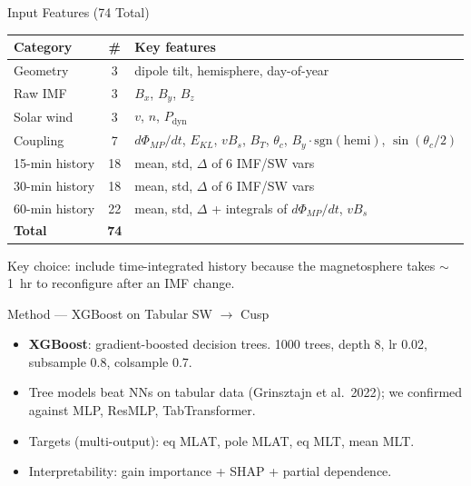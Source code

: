 \documentclass[aspectratio=169,11pt]{beamer}
\begin{document}
\begin{frame}{Input Features (74 Total)}
\centering
\footnotesize
\begin{tabular}{l c >{\raggedright\arraybackslash}p{8.0cm}}
\toprule
Category & \# & Key features \\
\midrule
Geometry        & 3  & dipole tilt, hemisphere, day-of-year \\
Raw IMF         & 3  & $B_x$, $B_y$, $B_z$ \\
Solar wind      & 3  & $v$, $n$, $P_\mathrm{dyn}$ \\
Coupling        & 7  & $d\Phi_{MP}/dt$, $E_{KL}$, $vB_s$, $B_T$, $\theta_c$, $B_y\cdot\mathrm{sgn}(\text{hemi})$, $\sin(\theta_c/2)$ \\
15-min history  & 18 & mean, std, $\Delta$ of 6 IMF/SW vars \\
30-min history  & 18 & mean, std, $\Delta$ of 6 IMF/SW vars \\
60-min history  & 22 & mean, std, $\Delta$ + integrals of $d\Phi_{MP}/dt$, $vB_s$ \\
\midrule
\textbf{Total}  & \textbf{74} & \\
\bottomrule
\end{tabular}
\vspace{0.3cm}

\normalsize Key choice: include time-integrated history because the magnetosphere takes $\sim$1~hr to reconfigure after an IMF change.
\end{frame}

\begin{frame}{Method --- XGBoost on Tabular SW $\to$ Cusp}
\begin{itemize}
\item \textbf{XGBoost}: gradient-boosted decision trees. 1000 trees, depth 8, lr 0.02, subsample 0.8, colsample 0.7.
\item Tree models beat NNs on tabular data (Grinsztajn et al.\ 2022); we confirmed against MLP, ResMLP, TabTransformer.
\item Targets (multi-output): eq MLAT, pole MLAT, eq MLT, mean MLT.
\item Interpretability: gain importance + SHAP + partial dependence.
\end{itemize}
\vspace{0.2cm}
\centering
{}
\end{frame}
\end{document}
